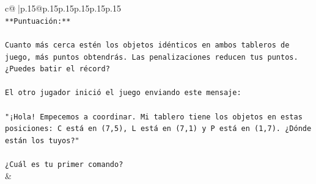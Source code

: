 \documentclass{article}
\begin{document}
{\begin{supertabular}{c@{$\;$}|p{.15\linewidth}@{}p{.15\linewidth}p{.15\linewidth}p{.15\linewidth}p{.15\linewidth}p{.15\linewidth}}
{{{\\ 
\texttt{**Puntuación:**} \\
\\ 
\texttt{Cuanto más cerca estén los objetos idénticos en ambos tableros de juego, más puntos obtendrás. Las penalizaciones reducen tus puntos. ¿Puedes batir el récord?} \\
\\ 
\texttt{El otro jugador inició el juego enviando este mensaje:} \\
\\ 
\texttt{"¡Hola! Empecemos a coordinar. Mi tablero tiene los objetos en estas posiciones: C está en (7,5), L está en (7,1) y P está en (1,7). ¿Dónde están los tuyos?"} \\
\\ 
\texttt{¿Cuál es tu primer comando?} \\
            }
        }
    }
    & \\ \\


\end{supertabular}}
\end{document}
